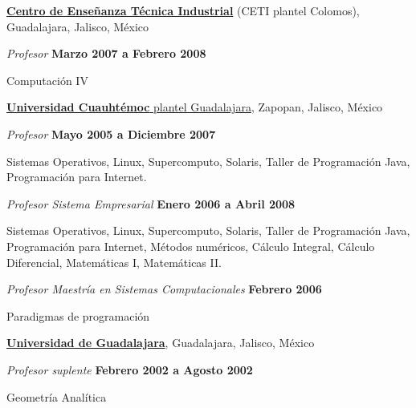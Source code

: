 \blankline

\href{http://www.colomos.ceti.mx/}{\textbf{Centro de Enseñanza Técnica
Industrial}} (CETI plantel Colomos),
Guadalajara, Jalisco, México
\begin{outerlist}
\item[] \textit{Profesor}%
    \hfill \textbf{Marzo 2007 a Febrero 2008}
    \begin{innerlist}
        \item Computación IV
    \end{innerlist}
\end{outerlist}

\blankline

\href{https://www.ucg.edu.mx/}{\textbf{Universidad Cuauhtémoc} plantel Guadalajara},
Zapopan, Jalisco, México
\begin{outerlist}
\item[] \textit{Profesor}%
    \hfill \textbf{Mayo 2005 a Diciembre 2007}
    \begin{innerlist}
        \item Sistemas Operativos, Linux, Supercomputo, Solaris, Taller de
Programación Java, Programación para Internet.
    \end{innerlist}
\item[] \textit{Profesor Sistema Empresarial}%
    \hfill \textbf{Enero 2006 a Abril 2008}
    \begin{innerlist}
        \item Sistemas Operativos, Linux, Supercomputo, Solaris, Taller de
Programación Java, Programación para Internet, Métodos numéricos, Cálculo
Integral, Cálculo Diferencial, Matemáticas I, Matemáticas II.
    \end{innerlist}
\item[] \textit{Profesor Maestría en Sistemas Computacionales}%
    \hfill \textbf{Febrero 2006}
    \begin{innerlist}
        \item Paradigmas de programación
    \end{innerlist}
\end{outerlist}

\blankline

\href{http://www.udg.mx/}{\textbf{Universidad de Guadalajara}},
Guadalajara, Jalisco, México
\begin{outerlist}
\item[] \textit{Profesor suplente}%
    \hfill \textbf{Febrero 2002 a Agosto 2002}
    \begin{innerlist}
        \item Geometría Analítica
    \end{innerlist}
\end{outerlist}


